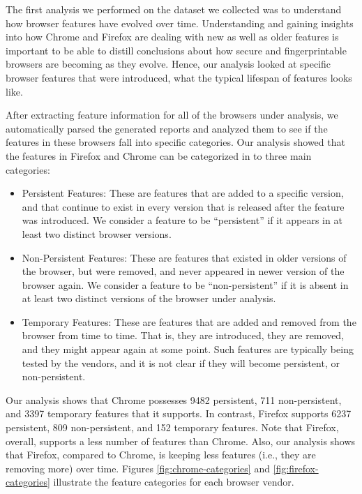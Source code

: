 The first analysis we performed on the dataset we collected was to
understand how browser features have evolved over time. Understanding
and gaining insights into how Chrome and Firefox are dealing with new
as well as older features is important to be able to distill
conclusions about how secure and fingerprintable browsers are becoming
as they evolve. Hence, our analysis looked at specific browser
features that were introduced, what the typical lifespan of features
looks like.

After extracting feature information for all of the browsers under
analysis, we automatically parsed the generated reports and analyzed
them to see if the features in these browsers fall into specific
categories. Our analysis showed that the features in Firefox and
Chrome can be categorized in to three main categories:

\begin{itemize}
  
\item Persistent Features: These are features that are added to a
  specific version, and that continue to exist in every version that
  is released after the feature was introduced. We consider a feature
  to be ``persistent'' if it appears in at least two distinct browser
  versions.
      
\item Non-Persistent Features: These are features that existed in
  older versions of the browser, but were removed, and never appeared
  in newer version of the browser again. We consider a feature to be
  ``non-persistent'' if it is absent in at least two distinct versions
  of the browser under analysis.
      
\item Temporary Features: These are features that are added and
  removed from the browser from time to time. That is, they are
  introduced, they are removed, and they might appear again at some
  point. Such features are typically being tested by the vendors, and
  it is not clear if they will become persistent, or non-persistent.

\end{itemize}

Our analysis shows that Chrome possesses 9482 persistent, 711
non-persistent, and 3397 temporary features that it supports. In
contrast, Firefox supports 6237 persistent, 809 non-persistent, and
152 temporary features. Note that Firefox, overall, supports a less
number of features than Chrome. Also, our analysis shows that Firefox,
compared to Chrome, is keeping less features (i.e., they are removing
more) over time. Figures \ref{fig:chrome-categories} and
\ref{fig:firefox-categories} illustrate the feature categories for
each browser vendor.


